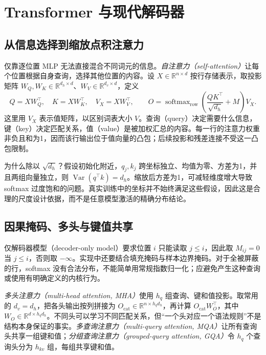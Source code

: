 \setcounter{chapter}{4} %
\chapter{Transformer 与现代解码器}
\label{ch:transformer}

\section{从信息选择到缩放点积注意力}

仅靠逐位置 MLP 无法直接混合不同词元的信息。\emph{自注意力（self-attention）}让每个位置根据自身查询，选择其他位置的内容。设 $X\in\mathbb R^{n\times d}$ 按行存储表示，取投影矩阵 $W_Q,W_K\in\mathbb R^{d_h\times d}$、$W_V\in\mathbb R^{d_v\times d}$，定义
\begin{equation}
Q=XW_Q^\top,\quad K=XW_K^\top,\quad V_X=XW_V^\top,\qquad
O=\operatorname{softmax}_{\mathrm{row}}\!\left(\frac{QK^\top}{\sqrt{d_h}}+M\right)V_X.
\label{eq:attention}
\end{equation}
这里用 $V_X$ 表示值矩阵，以区别词表大小 $V$。查询（query）决定需要什么信息，键（key）决定匹配关系，值（value）是被加权汇总的内容。每一行的注意力权重非负且和为1，因而该行输出位于值向量的凸包；后续投影和残差连接不受这一凸包限制。

为什么除以 $\sqrt{d_h}$？假设初始化附近，$q_j,k_j$ 跨坐标独立、均值为零、方差为1，并且两组向量独立，则 $\operatorname{Var}(q^\top k)=d_h$。缩放后方差为1，可减轻维度增大导致 softmax 过度饱和的问题。真实训练中的坐标并不始终满足这些假设，因此这是合理的尺度设计依据，而不是任意模型激活的精确分布结论\cite{attention}。

\section{因果掩码、多头与键值共享}

仅解码器模型（decoder-only model）要求位置 $i$ 只能读取 $j\le i$，因此取 $M_{ij}=0$ 当 $j\le i$，否则取 $-\infty$。实现中还要结合填充掩码与样本边界掩码。对于全被屏蔽的行，softmax 没有合法分布，不能简单用常规指数归一化；应避免产生这种查询或使用有明确定义的内核行为。

\emph{多头注意力（multi-head attention, MHA）}使用 $h_q$ 组查询、键和值投影。取常用的 $d_v=d_h$，把各头输出按列拼接为 $O_{\mathrm{cat}}\in\mathbb R^{n\times h_qd_h}$，再计算 $O_{\mathrm{cat}}W_O^\top$，其中 $W_O\in\mathbb R^{d\times h_qd_h}$。不同头可以学习不同匹配关系，但“一个头对应一个语法规则”不是结构本身保证的事实。\emph{多查询注意力（multi-query attention, MQA）}让所有查询头共享一组键和值；\emph{分组查询注意力（grouped-query attention, GQA）}令 $h_q$ 个查询头分为 $h_{kv}$ 组，每组共享键和值\cite{gqa}。


